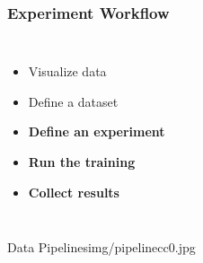 \documentclass[aspectratio=169,11pt,hyperref={colorlinks=true}]{beamer}
\begin{document}
\begin{frame}
    \frametitle{Experiment Workflow}
    \begin{columns}
        \begin{itemize}
            \item{Visualize data}
            \item{Define a dataset}
            \item{\textbf{Define an experiment}}
            \item{\textbf{Run the training}}
            \item{\textbf{Collect results}}
        \end{itemize}
          \begin{figure}
            
          \end{figure}
          \begin{figure}
            
          \end{figure}
    \end{columns}
\end{frame}

\begin{sectionpic}
{Data Pipelines}{img/pipelinecc0.jpg}
\end{sectionpic}
\end{document}
